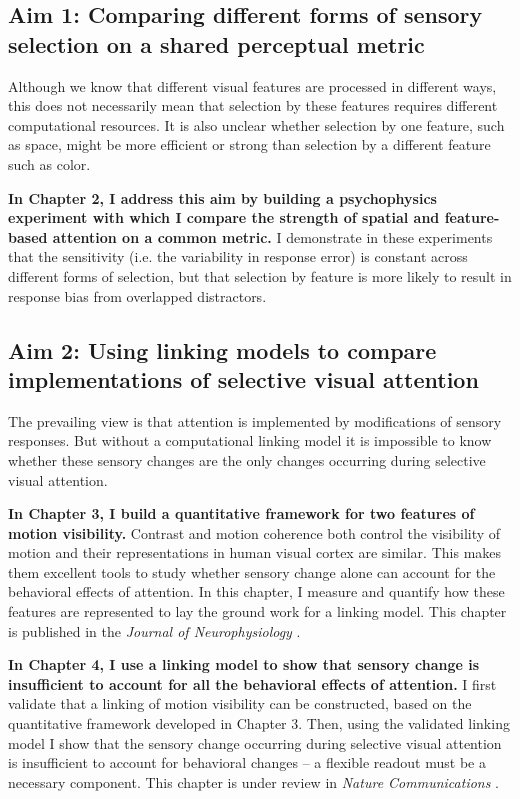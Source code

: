 \subsection{Aim 1: Comparing different forms of sensory selection on a shared perceptual metric}

Although we know that different visual features are processed in different ways, this does not necessarily mean that selection by these features requires different computational resources. It is also unclear whether selection by one feature, such as space, might be more efficient or strong than selection by a different feature such as color.

\textbf{In Chapter 2, I address this aim by building a psychophysics experiment with which I compare the strength of spatial and feature-based attention on a common metric.} I demonstrate in these experiments that the sensitivity (i.e. the variability in response error) is constant across different forms of selection, but that selection by feature is more likely to result in response bias from overlapped distractors. 

\subsection{Aim 2: Using linking models to compare implementations of selective visual attention}

The prevailing view is that attention is implemented by modifications of sensory responses. But without a computational linking model it is impossible to know whether these sensory changes are the only changes occurring during selective visual attention. 

\textbf{In Chapter 3, I build a quantitative framework for two features of motion visibility.} Contrast and motion coherence both control the visibility of motion and their representations in human visual cortex are similar. This makes them excellent tools to study whether sensory change alone can account for the behavioral effects of attention. In this chapter, I measure and quantify how these features are represented to lay the ground work for a linking model. This chapter is published in the \textit{Journal of Neurophysiology} \citep{Birman2018-sp}.

\textbf{In Chapter 4, I use a linking model to show that sensory change is insufficient to account for all the behavioral effects of attention.} I first validate that a linking of motion visibility can be constructed, based on the quantitative framework developed in Chapter 3. Then, using the validated linking model I show that the sensory change occurring during selective visual attention is insufficient to account for behavioral changes -- a flexible readout must be a necessary component. This chapter is under review in \textit{Nature Communications} \citep{Birman_undated-vk}.
